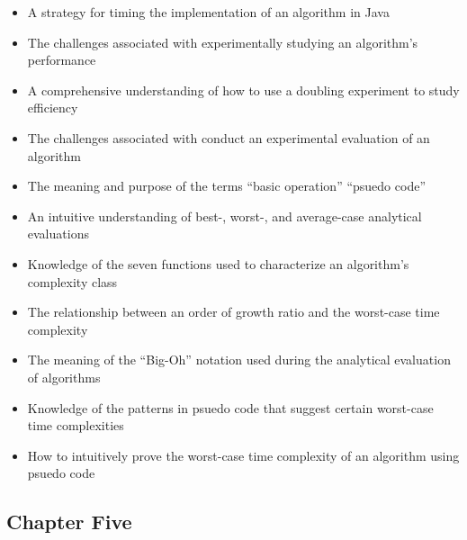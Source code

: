 \documentclass[11pt]{article}
\begin{document}
\begin{itemize}

  \setlength{\itemsep}{0.05in}

  \item A strategy for timing the implementation of an algorithm in Java
  \item The challenges associated with experimentally studying an algorithm's
    performance
  \item A comprehensive understanding of how to use a doubling experiment to
    study efficiency
  \item The challenges associated with conduct an experimental evaluation of an
    algorithm
  \item The meaning and purpose of the terms ``basic operation'' ``psuedo code''
  \item An intuitive understanding of best-, worst-, and average-case analytical
    evaluations
  \item Knowledge of the seven functions used to characterize an algorithm's
    complexity class
  \item The relationship between an order of growth ratio and the worst-case
    time complexity
  \item The meaning of the ``Big-Oh'' notation used during the
    analytical evaluation of algorithms
  \item Knowledge of the patterns in psuedo code that suggest certain
    worst-case time complexities
  \item How to intuitively prove the worst-case time complexity of an algorithm
    using psuedo code

\end{itemize}

\vspace*{-.2in}
\subsection*{Chapter Five}
\end{document}
